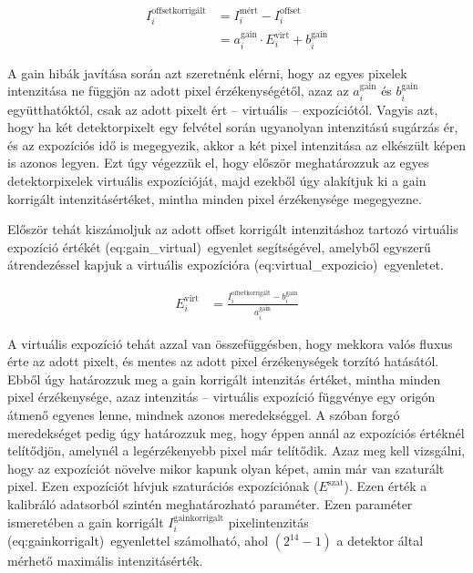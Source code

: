 \documentclass[a4paper,12pt]{article}
\begin{document}
\begin{equation}
\label{eq:gain_virtual}
\begin{split}
I_i^{\text{offsetkorrigált}}  &=  I_i^{\text{mért}} - I_i^{\text{offset}} \\&=  a_i^{\text{gain}} \cdot E_i^{\text{virt}} + b_i^{\text{gain}}
\end{split}
\end{equation}


A gain hibák javítása során azt szeretnénk elérni, hogy az egyes pixelek intenzitása ne függjön az adott pixel érzékenységétől, azaz az $a_i^{\text{gain}}  $ és $b_i^{\text{gain}}$  együtthatóktól, csak az adott pixelt ért -- virtuális -- expozíciótól. Vagyis azt, hogy ha két detektorpixelt egy felvétel során ugyanolyan intenzitású sugárzás ér, és az expozíciós idő is megegyezik, akkor a két pixel intenzitása az elkészült képen is azonos legyen. 
Ezt úgy végezzük el, hogy először meghatározzuk az egyes detektorpixelek virtuális expozícióját, majd ezekből úgy alakítjuk ki a gain korrigált intenzitásértéket, mintha minden pixel érzékenysége megegyezne.

Először tehát kiszámoljuk az adott offset korrigált intenzitáshoz tartozó virtuális expozíció értékét \aref({eq:gain_virtual})~egyenlet segítségével, amelyből egyszerű átrendezéssel kapjuk a virtuális expozícióra  \aref({eq:virtual_expozicio})~egyenletet. 

\begin{equation}
\label{eq:virtual_expozicio}
\begin{split}
 E_i^{\text{virt}} &= \frac{I_i^{\text{offsetkorrigált}} -  b_i^{\text{gain}}}{  a_i^{\text{gain}}}
 \end{split}
\end{equation}



 A virtuális expozíció tehát azzal van összefüggésben, hogy mekkora valós fluxus érte az adott pixelt, és mentes az adott pixel érzékenységek torzító hatásától. Ebből úgy határozzuk meg a gain korrigált intenzitás értéket, mintha minden pixel érzékenysége, azaz intenzitás -- virtuális expozíció függvénye egy origón átmenő egyenes lenne, mindnek azonos meredekséggel. A szóban forgó meredekséget pedig úgy határozzuk meg, hogy éppen annál az expozíciós értéknél telítődjön, amelynél a legérzékenyebb pixel már telítődik. Azaz meg kell vizsgálni, hogy az expozíciót növelve mikor kapunk olyan képet, amin már van szaturált pixel. Ezen expozíciót hívjuk szaturációs expozíciónak ($E^\text{szat}$). Ezen érték a kalibráló adatsorból szintén meghatározható paraméter. Ezen paraméter ismeretében a gain korrigált $ I_i^{\text{gainkorrigalt}}$ pixelintenzitás \aref({eq:gainkorrigalt})~egyenlettel számolható, ahol $\left(2^{14} -1\right)$ a detektor által mérhető maximális intenzitásérték.
\end{document}
